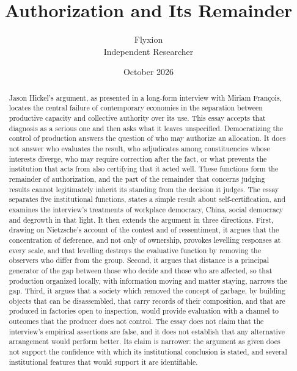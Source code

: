 \documentclass[12pt]{article}
\title{Authorization and Its Remainder}
\author{Flyxion\\ \small Independent Researcher}
\date{October 2026}
\theoremstyle{definition}
\begin{document}
\maketitle

\begin{abstract}
\noindent Jason Hickel's argument, as presented in a long-form interview with Miriam Fran\c{c}ois, locates the central failure of contemporary economies in the separation between productive capacity and collective authority over its use. This essay accepts that diagnosis as a serious one and then asks what it leaves unspecified. Democratizing the control of production answers the question of who may authorize an allocation. It does not answer who evaluates the result, who adjudicates among constituencies whose interests diverge, who may require correction after the fact, or what prevents the institution that acts from also certifying that it acted well. These functions form the remainder of authorization, and the part of the remainder that concerns judging results cannot legitimately inherit its standing from the decision it judges. The essay separates five institutional functions, states a simple result about self-certification, and examines the interview's treatments of workplace democracy, China, social democracy and degrowth in that light. It then extends the argument in three directions. First, drawing on Nietzsche's account of the contest and of ressentiment, it argues that the concentration of deference, and not only of ownership, provokes levelling responses at every scale, and that levelling destroys the evaluative function by removing the observers who differ from the group. Second, it argues that distance is a principal generator of the gap between those who decide and those who are affected, so that production organized locally, with information moving and matter staying, narrows the gap. Third, it argues that a society which removed the concept of garbage, by building objects that can be disassembled, that carry records of their composition, and that are produced in factories open to inspection, would provide evaluation with a channel to outcomes that the producer does not control. The essay does not claim that the interview's empirical assertions are false, and it does not establish that any alternative arrangement would perform better. Its claim is narrower: the argument as given does not support the confidence with which its institutional conclusion is stated, and several institutional features that would support it are identifiable.
\end{abstract}
\end{document}
